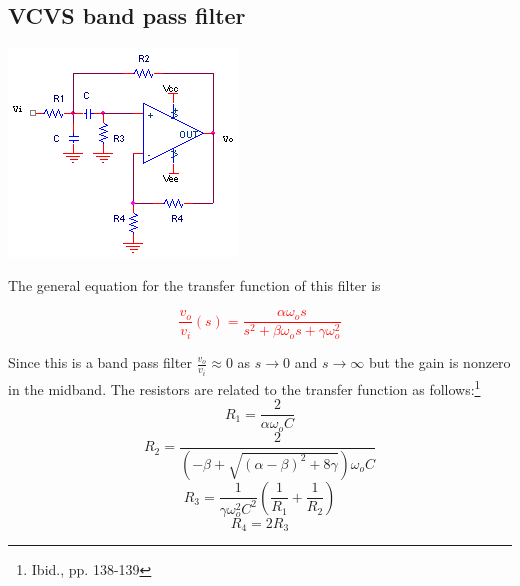 \subsection{VCVS band pass filter}
\begin{center}
	\includegraphics{schematics/vcvs_bandpass.PNG}
\end{center}
The general equation for the transfer function of this filter is

\textcolor{red}{
\begin{equation}
\frac{v_{o}}{v_{i}}(s) = \frac{\alpha \omega_{o}s}{s^{2}+\beta \omega_{o}s + \gamma \omega_{o}^{2}}
\label{eq:vcvs_bandpass}
\end{equation}
}

Since this is a band pass filter $\frac{v_{o}}{v_{i}} \approx 0$ as $s \rightarrow 0$ and $s \rightarrow \infty$ but the gain is nonzero in the midband. The resistors are related to the transfer function as follows:\footnote{Ibid., pp. 138-139}
\begin{equation}
R_{1} = \frac{2}{\alpha \omega_{o}C}
\end{equation}
\begin{equation}
R_{2} = \frac{2}{(-\beta+\sqrt{(\alpha - \beta)^{2} + 8\gamma})\omega_{o}C}
\end{equation}
\begin{equation}
R_{3} = \frac{1}{\gamma \omega_{o}^{2}C^{2}}\left(\frac{1}{R_{1}} + \frac{1}{R_{2}}\right)
\end{equation}
\begin{equation}
R_{4} = 2R_{3}
\end{equation}


